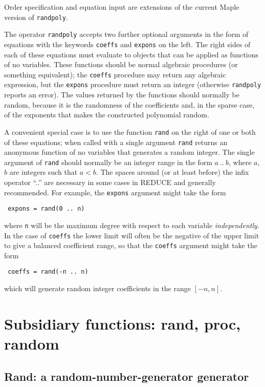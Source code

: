 Order specification and equation input are extensions of the current
Maple version of {\tt randpoly}.

The operator {\tt randpoly} accepts two further optional arguments in
the form of equations with the keywords {\tt coeffs} and {\tt expons}
on the left.  The right sides of each of these equations must evaluate
to objects that can be applied as functions of no variables.  These
functions should be normal algebraic procedures (or something
equivalent); the {\tt coeffs} procedure may return any algebraic
expression, but the {\tt expons} procedure must return an integer
(otherwise {\tt randpoly} reports an error).  The values returned by
the functions should normally be random, because it is the randomness
of the coefficients and, in the sparse case, of the exponents that
makes the constructed polynomial random.

A convenient special case is to use the function {\tt rand} on the
right of one or both of these equations; when called with a single
argument {\tt rand} returns an anonymous function of no variables that
generates a random integer.  The single argument of {\tt rand} should
normally be an integer range in the form $a~..~b$, where $a$, $b$ are
integers such that $a < b$.  The spaces around (or at least before)
the infix operator ``..'' are necessary in some cases in REDUCE and
generally recommended.  For example, the {\tt expons} argument might
take the form
\begin{center}\tt
  expons = rand(0~..~n)
\end{center}
where {\tt n} will be the maximum degree with respect to each variable
{\em independently}.  In the case of {\tt coeffs} the lower limit will
often be the negative of the upper limit to give a balanced
coefficient range, so that the {\tt coeffs} argument might take the
form
\begin{center}\tt
  coeffs = rand(-n~..~n)
\end{center}
which will generate random integer coefficients in the range $[-n,n]$.


\section{Subsidiary functions: rand, proc, random}
\label{sec:Subsidiary}

\subsection{Rand: a random-number-generator generator}

